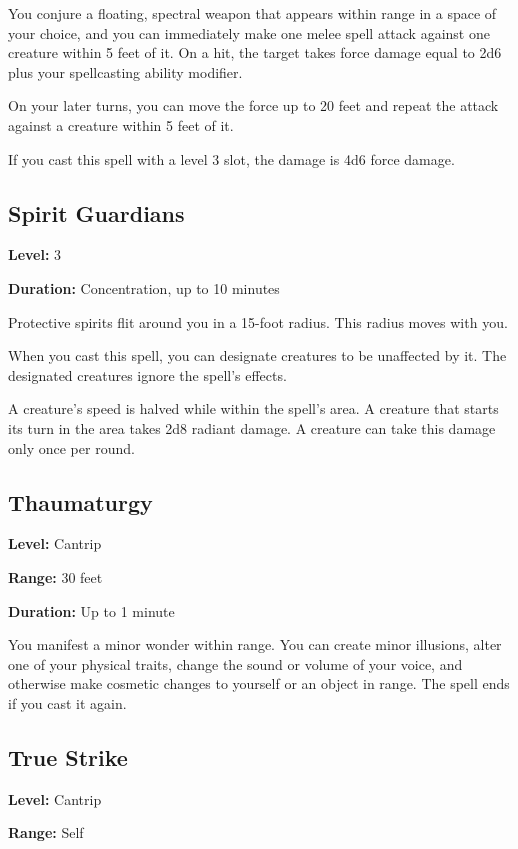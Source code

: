 \documentclass[12pt,letterpaper,twocolumn,openany,nodeprecatedcode,bg=none]{dndbook}
\let\oldsubsection\subsection
\renewcommand{\subsection}[1]{%
  \needspace{5\baselineskip}%
  \oldsubsection{#1}%
}
\begin{document}
You conjure a floating, spectral weapon that appears within range in a
space of your choice, and you can immediately make one melee spell
attack against one creature within 5 feet of it. On a hit, the target
takes force damage equal to 2d6 plus your spellcasting ability modifier.

On your later turns, you can move the force up to 20 feet and repeat the
attack against a creature within 5 feet of it.

If you cast this spell with a level 3 slot, the damage is 4d6 force
damage.

\subsection{Spirit Guardians}\label{spirit-guardians}

\textbf{Level:} 3

\textbf{Duration:} Concentration, up to 10 minutes

Protective spirits flit around you in a 15-foot radius. This radius
moves with you.

When you cast this spell, you can designate creatures to be unaffected
by it. The designated creatures ignore the spell's effects.

A creature's speed is halved while within the spell's area. A creature
that starts its turn in the area takes 2d8 radiant damage. A creature
can take this damage only once per round.

\subsection{Thaumaturgy}\label{thaumaturgy}

\textbf{Level:} Cantrip

\textbf{Range:} 30 feet

\textbf{Duration:} Up to 1 minute

You manifest a minor wonder within range. You can create minor
illusions, alter one of your physical traits, change the sound or volume
of your voice, and otherwise make cosmetic changes to yourself or an
object in range. The spell ends if you cast it again.

\subsection{True Strike}\label{true-strike}

\textbf{Level:} Cantrip

\textbf{Range:} Self
\end{document}
